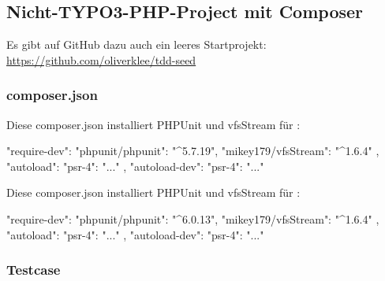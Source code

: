 \documentclass[a4paper,10pt,headsepline]{scrartcl}
\begin{document}
\subsection{Nicht-TYPO3-PHP-Project mit Composer}

Es gibt auf GitHub dazu auch ein leeres Startprojekt:\\
\url{https://github.com/oliverklee/tdd-seed}

\subsubsection{composer.json}

Diese composer.json installiert PHPUnit und vfsStream für :\\

\begin{jsoncode}
{
    "require-dev": {
        "phpunit/phpunit": "^5.7.19",
        "mikey179/vfsStream": "^1.6.4"
    },
    "autoload": {
        "psr-4": {
            "..."
        }
    },
    "autoload-dev": {
        "psr-4": {
            "..."
        }
    }
}
\end{jsoncode}

Diese composer.json installiert PHPUnit und vfsStream für :\\

\begin{jsoncode}
{
    "require-dev": {
        "phpunit/phpunit": "^6.0.13",
        "mikey179/vfsStream": "^1.6.4"
    },
    "autoload": {
        "psr-4": {
            "..."
        }
    },
    "autoload-dev": {
        "psr-4": {
            "..."
        }
    }
}
\end{jsoncode}

\subsubsection{Testcase}
\end{document}
